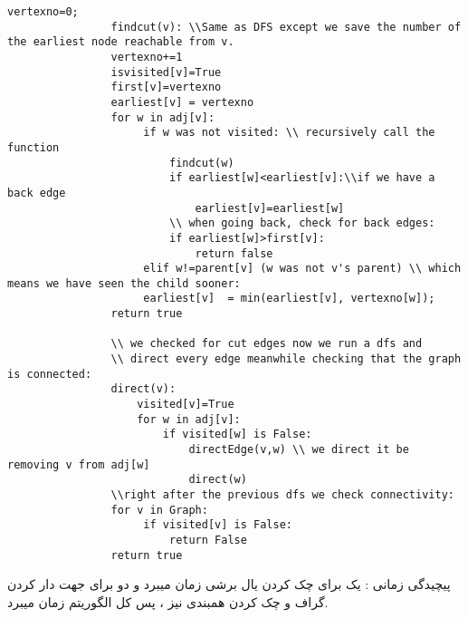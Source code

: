 \documentclass[11pt]{letter}
\begin{document}
			\begin{LTR}
				\begin{Verbatim}[tabsize=0]
				vertexno=0;
				findcut(v): \\Same as DFS except we save the number of the earliest node reachable from v.
				vertexno+=1
				isvisited[v]=True
				first[v]=vertexno
				earliest[v] = vertexno 
				for w in adj[v]: 
				     if w was not visited: \\ recursively call the function 
				         findcut(w)
				         if earliest[w]<earliest[v]:\\if we have a back edge
				             earliest[v]=earliest[w]
				         \\ when going back, check for back edges:
				         if earliest[w]>first[v]:
				             return false
				     elif w!=parent[v] (w was not v's parent) \\ which means we have seen the child sooner:
				     earliest[v]  = min(earliest[v], vertexno[w]); 
				return true
				
				\\ we checked for cut edges now we run a dfs and
				\\ direct every edge meanwhile checking that the graph is connected:
				direct(v):
				    visited[v]=True
				    for w in adj[v]:
				        if visited[w] is False:
				            directEdge(v,w) \\ we direct it be removing v from adj[w]
				            direct(w)
				\\right after the previous dfs we check connectivity:
				for v in Graph:
			         if visited[v] is False:
			             return False
			    return true        			
				\end{Verbatim}
			\end{LTR}
			پیچیدگی زمانی : یک
			برای چک کردن یال برشی
			زمان میبرد و دو
			برای جهت دار کردن گراف و چک کردن همبندی نیز 
						، پس کل الگوریتم
									زمان میبرد.
\end{document}
